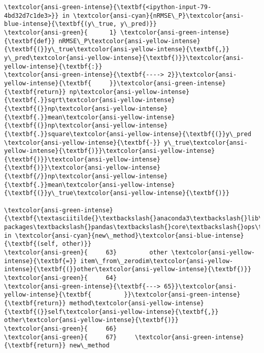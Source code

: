 \documentclass[11pt]{article}
\begin{document}
\begin{Verbatim}[commandchars=\\\{\}, frame=single, framerule=2mm, rulecolor=\color{outerrorbackground}]
\textcolor{ansi-green-intense}{\textbf{<ipython-input-79-4bd32d7c1de3>}} in \textcolor{ansi-cyan}{nRMSE\_P}\textcolor{ansi-blue-intense}{\textbf{(y\_true, y\_pred)}}
\textcolor{ansi-green}{      1} \textcolor{ansi-green-intense}{\textbf{def}} nRMSE\_P\textcolor{ansi-yellow-intense}{\textbf{(}}y\_true\textcolor{ansi-yellow-intense}{\textbf{,}} y\_pred\textcolor{ansi-yellow-intense}{\textbf{)}}\textcolor{ansi-yellow-intense}{\textbf{:}}
\textcolor{ansi-green-intense}{\textbf{----> 2}}\textcolor{ansi-yellow-intense}{\textbf{     }}\textcolor{ansi-green-intense}{\textbf{return}} np\textcolor{ansi-yellow-intense}{\textbf{.}}sqrt\textcolor{ansi-yellow-intense}{\textbf{(}}np\textcolor{ansi-yellow-intense}{\textbf{.}}mean\textcolor{ansi-yellow-intense}{\textbf{(}}np\textcolor{ansi-yellow-intense}{\textbf{.}}square\textcolor{ansi-yellow-intense}{\textbf{(}}y\_pred \textcolor{ansi-yellow-intense}{\textbf{-}} y\_true\textcolor{ansi-yellow-intense}{\textbf{)}}\textcolor{ansi-yellow-intense}{\textbf{)}}\textcolor{ansi-yellow-intense}{\textbf{)}}\textcolor{ansi-yellow-intense}{\textbf{/}}np\textcolor{ansi-yellow-intense}{\textbf{.}}mean\textcolor{ansi-yellow-intense}{\textbf{(}}y\_true\textcolor{ansi-yellow-intense}{\textbf{)}}

\textcolor{ansi-green-intense}{\textbf{\textasciitilde{}\textbackslash{}anaconda3\textbackslash{}lib\textbackslash{}site-packages\textbackslash{}pandas\textbackslash{}core\textbackslash{}ops\textbackslash{}common.py}} in \textcolor{ansi-cyan}{new\_method}\textcolor{ansi-blue-intense}{\textbf{(self, other)}}
\textcolor{ansi-green}{     63}         other \textcolor{ansi-yellow-intense}{\textbf{=}} item\_from\_zerodim\textcolor{ansi-yellow-intense}{\textbf{(}}other\textcolor{ansi-yellow-intense}{\textbf{)}}
\textcolor{ansi-green}{     64} 
\textcolor{ansi-green-intense}{\textbf{---> 65}}\textcolor{ansi-yellow-intense}{\textbf{         }}\textcolor{ansi-green-intense}{\textbf{return}} method\textcolor{ansi-yellow-intense}{\textbf{(}}self\textcolor{ansi-yellow-intense}{\textbf{,}} other\textcolor{ansi-yellow-intense}{\textbf{)}}
\textcolor{ansi-green}{     66} 
\textcolor{ansi-green}{     67}     \textcolor{ansi-green-intense}{\textbf{return}} new\_method


\end{Verbatim}
\end{document}

